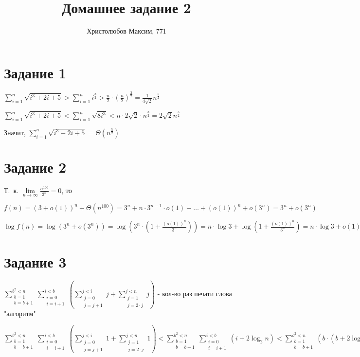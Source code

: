 \documentclass[a4paper,12pt]{article}
\author{Христолюбов Максим, 771}
\title{Домашнее задание 2}
\date{ }
\begin{document}

\maketitle

\section*{Задание 1}  
\hspace{0.5cm}
$\sum\limits_{i=1}^n \sqrt{i^3+2i+5}>\sum\limits_{i=1}^n i^{\frac{3}{2}}>\frac{n}{2}\cdot\left( \frac{n}{2}\right)^{\frac{3}{2}}=\frac{1}{4\sqrt{2}}n^{\frac{5}{2}}$
	
$\sum\limits_{i=1}^n \sqrt{i^3+2i+5}<\sum\limits_{i=1}^n \sqrt{8i^3}<n\cdot 2\sqrt{2}\cdot n^{\frac{3}{2}}=2\sqrt{2} n^{\frac{5}{2}}$

Значит, $\sum\limits_{i=1}^n \sqrt{i^3+2i+5} = \Theta(n^{\frac{5}{2}})$

\section*{Задание 2}  
\hspace{0.5cm}
Т.~к. $\lim\limits_{n\to\infty}\frac{n^{100}}{3^n}=0$, то

$f(n)=(3+o(1))^n+\Theta(n^{100})=3^n+n\cdot3^{n-1}\cdot o(1)+\ldots+(o(1))^n+o(3^n)=3^n+o(3^n)$

$\log{f(n)}=\log(3^n+o(3^n))=\log(3^n\cdot(1+\frac{(o(1))^n}{3^n}))=n\cdot\log3+\log(1+\frac{(o(1))^n}{3^n})=n\cdot\log3+o(1)=\Theta(n)$

\section*{Задание 3}  
\hspace{0.5cm}

$\sum\limits_{\substack{b=1 \\ b=b+1}}^{b^2<n}\sum\limits_{\substack{i=0 \\ i=i+1}}^{i<b}\left( \sum\limits_{\substack{j=0\\ j=j+1}}^{j<i}j+\sum\limits_{\substack{j=1\\j=2\cdot j}}^{j<n}j\right)$ - кол-во раз печати слова "алгоритм"

$\sum\limits_{\substack{b=1 \\ b=b+1}}^{b^2<n}\sum\limits_{\substack{i=0 \\ i=i+1}}^{i<b}\left( \sum\limits_{\substack{j=0\\ j=j+1}}^{j<i}1+\sum\limits_{\substack{j=1\\j=2\cdot j}}^{j<n}1\right)<
\sum\limits_{\substack{b=1 \\ b=b+1}}^{b^2<n}\sum\limits_{\substack{i=0 \\ i=i+1}}^{i<b}\left(
i+2\log_{2}n\right)<\sum\limits_{\substack{b=1 \\ b=b+1}}^{b^2<n}\left( b\cdot\left( b+2\log_{2}n\right) \right) < \sqrt{n} \cdot \left( \sqrt{n}\cdot\left( \sqrt{n}+2\log_{2}n\right) \right)<3\cdot n^{\frac{3}{2}}$
\end{document}
